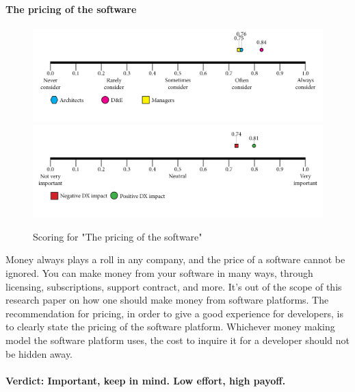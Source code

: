 \documentclass{article}
\begin{document}
\paragraph{The pricing of the software}
\begin{figure}[H]
\centering
\includegraphics[width=\linewidth]{scorelines/aspect9.png}
\includegraphics[width=\linewidth]{dxscorelines/dxaspect9.png}
\caption{Scoring for "The pricing of the software"}
\label{fig:aspect9}
\end{figure}
Money always plays a roll in any company, and the price of a software cannot be ignored. You can make money from your software in many ways, through licensing, subscriptions, support contract, and more. It's out of the scope of this research paper on how one should make money from software platforms. The recommendation for pricing, in order to give a good experience for developers, is to clearly state the pricing of the software platform. Whichever money making model the software platform uses, the cost to inquire it for a developer should not be hidden away. \\ \\
\textbf{Verdict: Important, keep in mind. Low effort, high payoff.}
\end{document}
